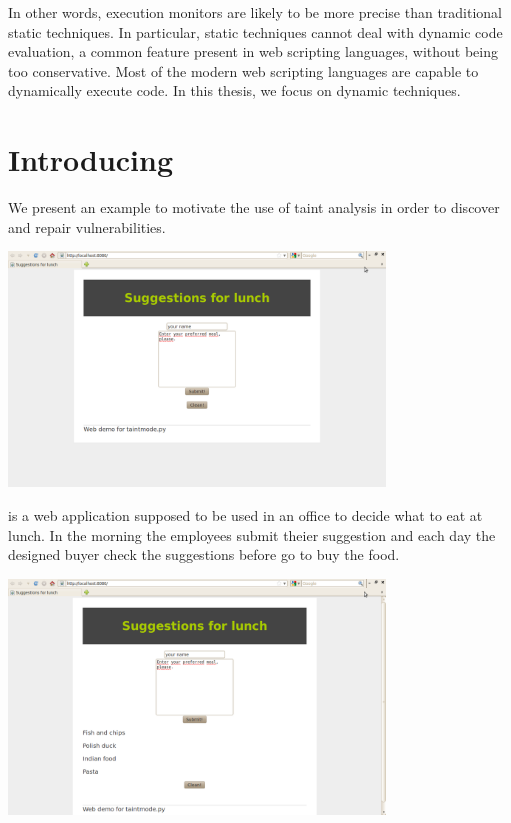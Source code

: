 In other words, 
execution monitors are likely to be more precise
than traditional static techniques. 
In particular, static techniques cannot  
deal with dynamic code evaluation,
a common feature present in web
scripting languages,  
without being too conservative.
Most of the modern web scripting 
languages are capable to dynamically execute code. 
In this thesis, we focus on dynamic techniques.

\section{Introducing \suggestions}
\label{Sec:Suggestions}

We present an example to motivate the use of 
taint analysis in order to discover and repair 
vulnerabilities.

\includegraphics[width=100mm]{lunch1.png}

\suggestions is a web application supposed
to be used in an office to decide what to eat at lunch.
In the morning the employees submit theier suggestion and each day
the designed buyer check the suggestions before go to buy the food.

\includegraphics[width=100mm]{lunch2.png}

